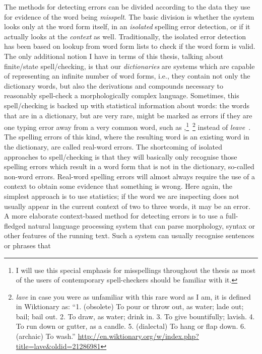 \documentclass[officiallayout,final]{unihelcompling}
\newcommand\misspelt{\bgroup\markoverwith
{\lower3.5pt\hbox{\sixly \char58}}\ULon}
\newcommand\misspelt{\bgroup\markoverwith
{\textcolor{red}{\lower3.5pt\hbox{\sixly \char58}}}\ULon}
\begin{document}
The methods for detecting errors can be divided according to the data they use
for evidence of the word being \emph{misspelt}. The basic division is whether the
system looks only at the \gls{word form} itself, in an \emph{isolated} spelling
error detection, or if it actually looks at the \emph{context} as well.
Traditionally, the isolated error detection has been based on lookup from
word form lists to check if the word form is valid. The only additional notion
I have in terms of this thesis, talking about finite\-/state spell\-/checking,
is that our \emph{dictionaries} are systems which are capable of representing an infinite
number of word forms, i.e., they contain not only the dictionary words, but
also the derivations and compounds necessary to reasonably spell-check a
morphologically complex language. Sometimes, this spell\-/checking is backed up
with statistical information about words: the words that are in a dictionary,
but are very rare, might be marked as errors if they are one typing error away
from a very common word, such as \misspelt{lave},\footnote{I will use this
    special emphasis for misspellings throughout the thesis as most of the
    users of contemporary spell-checkers should be familiar with
it.}~\footnote{\emph{lave} in case you were as unfamiliar with this rare word
    as I am, it is defined in Wiktionary as: ``1. (obsolete) To pour or throw
    out, as water; lade out; bail; bail out. 2. To draw, as water; drink in. 3.
To give bountifully; lavish. 4. To run down or gutter, as a candle. 5.
(dialectal) To hang or flap down. 6. (archaic) To wash.''
\url{http://en.wiktionary.org/w/index.php?title=lave&oldid=21286981}} instead
of \emph{leave}~\citep{kukich1992techniques}.  The spelling errors of this
kind, where the resulting word is an existing word in the dictionary, are
called \glspl{real-word error}.  The shortcoming of isolated approaches
to spell\-/checking is that they will basically only recognise those spelling
errors which result in a word form that is not in the dictionary,
so-called \glspl{non-word error}. Real-word spelling errors
will almost always require the use of a context to obtain some evidence that
something is wrong. Here again, the simplest approach is to use statistics; if
the word we are inspecting does not usually appear in the current context of
two to three words, it may be an error. A more elaborate context-based
method for detecting errors is to use a full-fledged natural language
processing system that can parse morphology, syntax or other features of the
running text.  Such a system can usually recognise sentences or phrases that
\end{document}
